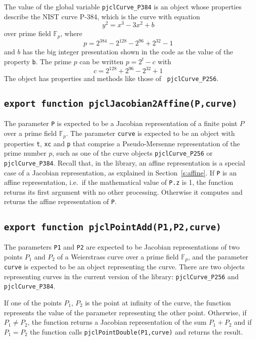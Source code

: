 \documentclass[12pt]{article}
\begin{document}
The value of the global variable {\tt pjclCurve\_P384} is an 
object whose properties describe the NIST
curve P-384, which is the curve with equation
$$
y^2 = x^3 - 3x^2 + b
$$
over prime field $\mathbb{F}_p$, where
$$
p = 2^{384} - 2^{128} - 2^{96} + 2^{32} - 1
$$
and $b$ has the big integer presentation shown in the code as the
value of the property {\tt b}.  The prime $p$ can be written $p=2^t-c$
with
$$
c = 2^{128} + 2^{96} - 2^{32} + 1
$$
The object has properties and methods like those of {\tt
  pjclCurve\_P256}.

\subsection{\tt export function pjclJacobian2Affine(P,curve)}

The parameter {\tt P} is expected to be a Jacobian representation of
a finite point $P$ over a prime field $\mathbb{F}_p$.  The
parameter {\tt curve} is expected to be an object with properties {\tt t}, {\tt xc} and {\tt p} that comprise a Pseudo-Mersenne representation of the prime number $p$,
such as one of the curve objects {\tt  pjclCurve\_P256} or {\tt  pjclCurve\_P384}.
Recall that, in the library, an affine representation 
is a special case of a Jacobian representation, as explained in Section~\ref{s:affine}.
If {\tt P} is an affine representation, i.e.\ if the mathematical value of {\tt P.z} is 1,
the function returns its first argument with no other processing.  Otherwise it computes
and returns the affine representation of {\tt P}.

\subsection{\tt export function pjclPointAdd(P1,P2,curve)}

The parameters {\tt P1} and {\tt P2} are expected to be Jacobian
representations of two points $P_1$ and $P_2$ of a Weierstrass curve
over a prime field $\mathbb{F}_p$, and the parameter {\tt curve} is expected to be an object representing the curve.  There are two objects representing curves in the current version of the library: {\tt pjclCurve\_P256} and {\tt pjclCurve\_P384}.

If one of the points $P_1$, $P_2$ is the point at infinity of the curve, the function represents the value of the parameter representing the other point.
Otherwise,
if $P_1\not=P_2$, the function returns a Jacobian representation of
the sum $P_1+P_2$ and
if $P_1=P_2$ the function calls {\tt pjclPointDouble(P1,curve)} and
returns the result.
\end{document}
